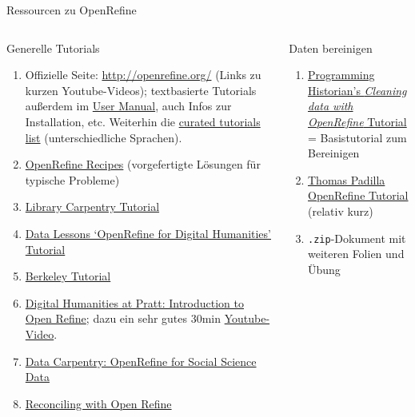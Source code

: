 \begin{frame}{Ressourcen zu OpenRefine}
\footnotesize
{}
\begin{columns}

\begin{block}{Generelle Tutorials}
  \begin{enumerate}\scriptsize
    \item Offizielle Seite: \protect\url{http://openrefine.org/} (Links zu kurzen Youtube-Videos); textbasierte Tutorials außerdem im \href{https://docs.openrefine.org/}{User Manual}, auch Infos zur Installation, etc. Weiterhin die \href{https://github.com/OpenRefine/OpenRefine/wiki/External-Resources}{curated tutorials list} (unterschiedliche Sprachen).
    \item \href{https://github.com/OpenRefine/OpenRefine/wiki/Recipes}{OpenRefine Recipes} (vorgefertigte Lösungen für typische Probleme)
    \item \href{https://librarycarpentry.org/lc-open-refine/01-introduction/index.html}{Library Carpentry Tutorial}
    \item \href{https://data-lessons.github.io/dh-openrefine/01-introduction/}{Data Lessons `OpenRefine for Digital Humanities' Tutorial}
    \item \href{https://multimedia.journalism.berkeley.edu/tutorials/openrefine/}{Berkeley Tutorial}
    \item \href{https://studentwork.prattsi.org/dh/2016/05/07/introduction-to-openrefine/}{Digital Humanities at Pratt: Introduction to Open Refine}; dazu ein sehr gutes 30min \href{https://www.youtube.com/watch?v=WCRexQXYFrI}{Youtube-Video}.
    \item \href{https://datacarpentry.org/openrefine-socialsci/}{Data Carpentry: OpenRefine for Social Science Data}
    \item \href{https://histhub.ch/reconciling/}{Reconciling with Open Refine}
\end{enumerate}
\end{block}



\begin{exampleblock}{Daten bereinigen}
  \begin{enumerate}\scriptsize
    \item \href{https://programminghistorian.org/en/lessons/cleaning-data-with-openrefine}{Programming Historian's \emph{Cleaning data with OpenRefine} Tutorial} = Basistutorial zum Bereinigen
    \item \href{https://thomaspadilla.org/dataprep/}{Thomas Padilla OpenRefine Tutorial} (relativ kurz)
    \item \texttt{.zip}-Dokument mit weiteren Folien und Übung
\end{enumerate}
\end{exampleblock}


\end{columns}
\end{frame}

